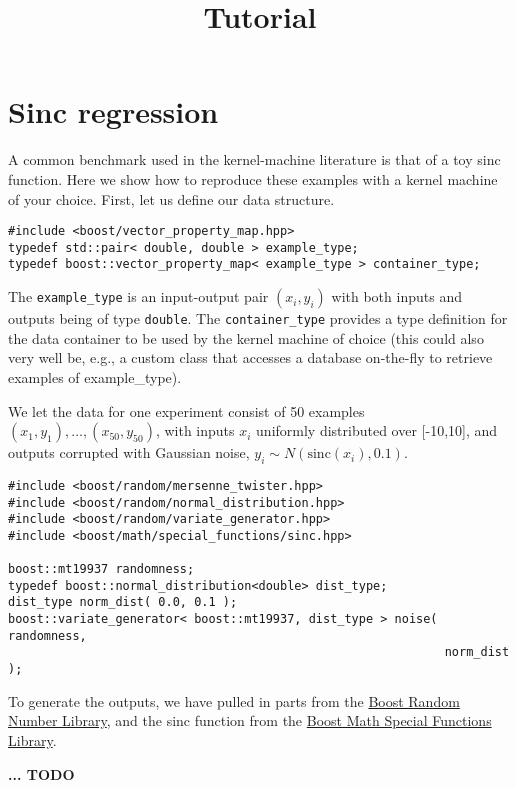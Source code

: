 \documentclass{article}
\begin{document}
\title{Tutorial}
\maketitle

\section*{Sinc regression}

A common benchmark used in the kernel-machine literature is that of a toy sinc function. 
Here we show how to reproduce these examples with a kernel machine of your choice. 
First, let us define our data structure.
%
\highlightcpp{}
\begin{verbatim}
#include <boost/vector_property_map.hpp>
typedef std::pair< double, double > example_type;
typedef boost::vector_property_map< example_type > container_type;
\end{verbatim}
%
The \texttt{example_type} is an input-output pair $(x_i,y_i)$ with both inputs and outputs being
of type \texttt{double}.
The \texttt{container_type} provides a type definition for the data container to
be used by the kernel machine of choice 
(this could also very well be, e.g., a custom class that 
accesses a database on-the-fly to retrieve examples of example_type).

We let the data for one experiment consist of 50 examples $(x_1,y_1),\ldots,(x_{50},y_{50})$,
with inputs $x_{i}$ uniformly distributed over [-10,10],
and outputs corrupted with Gaussian noise, $y_{i}\sim N(\mathrm{sinc}(x_{i}),0.1)$.
%
\highlightcpp{}
\begin{verbatim}
#include <boost/random/mersenne_twister.hpp>
#include <boost/random/normal_distribution.hpp>
#include <boost/random/variate_generator.hpp>
#include <boost/math/special_functions/sinc.hpp>

boost::mt19937 randomness;
typedef boost::normal_distribution<double> dist_type;
dist_type norm_dist( 0.0, 0.1 );
boost::variate_generator< boost::mt19937, dist_type > noise( randomness, 
                                                             norm_dist );
\end{verbatim}
%
To generate the outputs, we have pulled in parts from the 
\href{http://www.boost.org/libs/random/index.html}{Boost Random Number Library}, and the
sinc function from the
\href{http://www.boost.org/libs/math/special_functions/index.html}{Boost Math Special Functions Library}. 

\textbf{... TODO}
\end{document}
